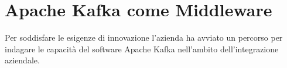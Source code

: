 %
%
%
%


\section{Apache Kafka come Middleware}

Per soddisfare le esigenze di innovazione l'azienda ha avviato un percorso per indagare le capacità del software Apache Kafka nell'ambito dell'integrazione aziendale.

